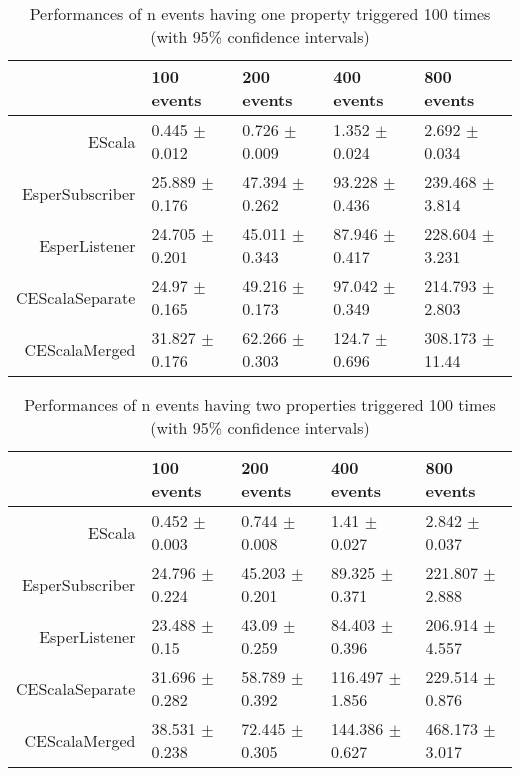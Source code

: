 \begin{table}[tp]
\centering
{\footnotesize
\begin{tabular}{rllll}
  \toprule
 & 100 events & 200 events & 400 events & 800 events \\ 
  \midrule
EScala & 0.445 $\pm$ 0.012 & 0.726 $\pm$ 0.009 & 1.352 $\pm$ 0.024 & 2.692 $\pm$ 0.034 \\ 
  EsperSubscriber & 25.889 $\pm$ 0.176 & 47.394 $\pm$ 0.262 & 93.228 $\pm$ 0.436 & 239.468 $\pm$ 3.814 \\ 
  EsperListener & 24.705 $\pm$ 0.201 & 45.011 $\pm$ 0.343 & 87.946 $\pm$ 0.417 & 228.604 $\pm$ 3.231 \\ 
  CEScalaSeparate & 24.97 $\pm$ 0.165 & 49.216 $\pm$ 0.173 & 97.042 $\pm$ 0.349 & 214.793 $\pm$ 2.803 \\ 
  CEScalaMerged & 31.827 $\pm$ 0.176 & 62.266 $\pm$ 0.303 & 124.7 $\pm$ 0.696 & 308.173 $\pm$ 11.44 \\ 
   \bottomrule
\end{tabular}
}
\caption{Performances of n events having one property triggered 100 times \\ (with 95\% confidence intervals)} 
\label{table:E.SP.Performance}
\end{table}
\begin{table}[tp]
\centering
{\footnotesize
\begin{tabular}{rllll}
  \toprule
 & 100 events & 200 events & 400 events & 800 events \\ 
  \midrule
EScala & 0.452 $\pm$ 0.003 & 0.744 $\pm$ 0.008 & 1.41 $\pm$ 0.027 & 2.842 $\pm$ 0.037 \\ 
  EsperSubscriber & 24.796 $\pm$ 0.224 & 45.203 $\pm$ 0.201 & 89.325 $\pm$ 0.371 & 221.807 $\pm$ 2.888 \\ 
  EsperListener & 23.488 $\pm$ 0.15 & 43.09 $\pm$ 0.259 & 84.403 $\pm$ 0.396 & 206.914 $\pm$ 4.557 \\ 
  CEScalaSeparate & 31.696 $\pm$ 0.282 & 58.789 $\pm$ 0.392 & 116.497 $\pm$ 1.856 & 229.514 $\pm$ 0.876 \\ 
  CEScalaMerged & 38.531 $\pm$ 0.238 & 72.445 $\pm$ 0.305 & 144.386 $\pm$ 0.627 & 468.173 $\pm$ 3.017 \\ 
   \bottomrule
\end{tabular}
}
\caption{Performances of n events having two properties triggered 100 times \\ (with 95\% confidence intervals)} 
\label{table:E.TP.Performance}
\end{table}
